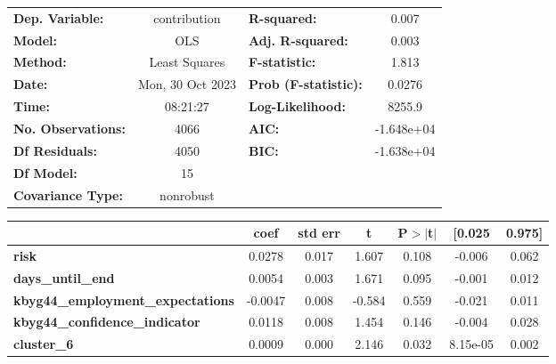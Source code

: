 \begin{center}
\begin{tabular}{lclc}
\toprule
\textbf{Dep. Variable:}                   &   contribution   & \textbf{  R-squared:         } &     0.007   \\
\textbf{Model:}                           &       OLS        & \textbf{  Adj. R-squared:    } &     0.003   \\
\textbf{Method:}                          &  Least Squares   & \textbf{  F-statistic:       } &     1.813   \\
\textbf{Date:}                            & Mon, 30 Oct 2023 & \textbf{  Prob (F-statistic):} &   0.0276    \\
\textbf{Time:}                            &     08:21:27     & \textbf{  Log-Likelihood:    } &    8255.9   \\
\textbf{No. Observations:}                &        4066      & \textbf{  AIC:               } & -1.648e+04  \\
\textbf{Df Residuals:}                    &        4050      & \textbf{  BIC:               } & -1.638e+04  \\
\textbf{Df Model:}                        &          15      & \textbf{                     } &             \\
\textbf{Covariance Type:}                 &    nonrobust     & \textbf{                     } &             \\
\bottomrule
\end{tabular}
\begin{tabular}{lcccccc}
                                          & \textbf{coef} & \textbf{std err} & \textbf{t} & \textbf{P$> |$t$|$} & \textbf{[0.025} & \textbf{0.975]}  \\
\midrule
\textbf{risk}                             &       0.0278  &        0.017     &     1.607  &         0.108        &       -0.006    &        0.062     \\
\textbf{days\_until\_end}                 &       0.0054  &        0.003     &     1.671  &         0.095        &       -0.001    &        0.012     \\
\textbf{kbyg44\_employment\_expectations} &      -0.0047  &        0.008     &    -0.584  &         0.559        &       -0.021    &        0.011     \\
\textbf{kbyg44\_confidence\_indicator}    &       0.0118  &        0.008     &     1.454  &         0.146        &       -0.004    &        0.028     \\
\textbf{cluster\_6}                       &       0.0009  &        0.000     &     2.146  &         0.032        &     8.15e-05    &        0.002     \\

\end{tabular}
\end{center}
